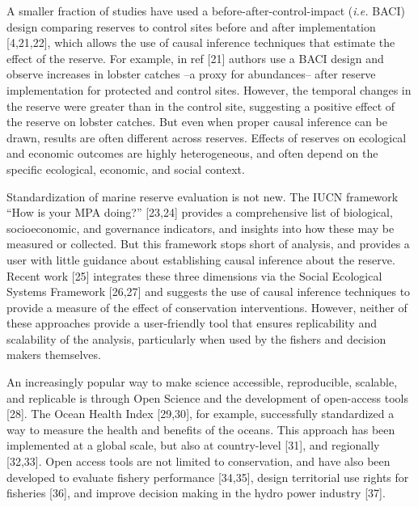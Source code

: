 \documentclass[12pt,]{article}
\begin{document}
A smaller fraction of studies have used a before-after-control-impact
(\emph{i.e.} BACI) design comparing reserves to control sites before and
after implementation {[}4,21,22{]}, which allows the use of causal
inference techniques that estimate the effect of the reserve. For
example, in ref {[}21{]} authors use a BACI design and observe increases
in lobster catches --a proxy for abundances-- after reserve
implementation for protected and control sites. However, the temporal
changes in the reserve were greater than in the control site, suggesting
a positive effect of the reserve on lobster catches. But even when
proper causal inference can be drawn, results are often different across
reserves. Effects of reserves on ecological and economic outcomes are
highly heterogeneous, and often depend on the specific ecological,
economic, and social context.

Standardization of marine reserve evaluation is not new. The IUCN
framework ``How is your MPA doing?'' {[}23,24{]} provides a
comprehensive list of biological, socioeconomic, and governance
indicators, and insights into how these may be measured or collected.
But this framework stops short of analysis, and provides a user with
little guidance about establishing causal inference about the reserve.
Recent work {[}25{]} integrates these three dimensions via the Social
Ecological Systems Framework {[}26,27{]} and suggests the use of causal
inference techniques to provide a measure of the effect of conservation
interventions. However, neither of these approaches provide a
user-friendly tool that ensures replicability and scalability of the
analysis, particularly when used by the fishers and decision makers
themselves.

An increasingly popular way to make science accessible, reproducible,
scalable, and replicable is through Open Science and the development of
open-access tools {[}28{]}. The Ocean Health Index {[}29,30{]}, for
example, successfully standardized a way to measure the health and
benefits of the oceans. This approach has been implemented at a global
scale, but also at country-level {[}31{]}, and regionally {[}32,33{]}.
Open access tools are not limited to conservation, and have also been
developed to evaluate fishery performance {[}34,35{]}, design
territorial use rights for fisheries {[}36{]}, and improve decision
making in the hydro power industry {[}37{]}.
\end{document}
